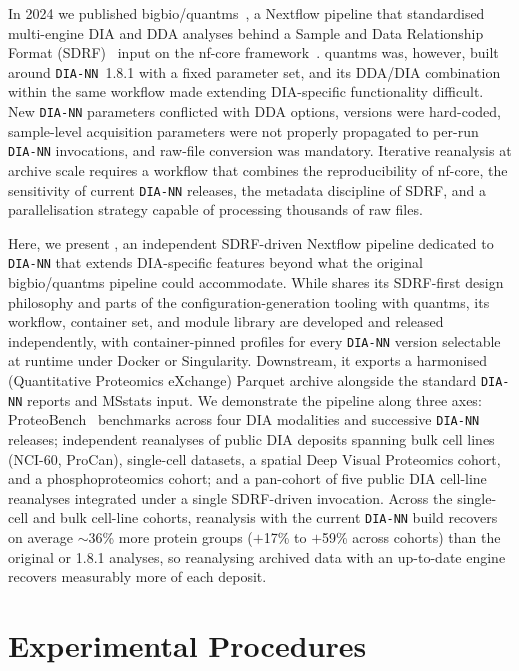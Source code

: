 \documentclass[preprint,12pt]{elsarticle}
\begin{document}
In 2024 we published bigbio/quantms~\cite{dai2024quantms}, a Nextflow pipeline that standardised multi-engine DIA and DDA analyses behind a Sample and Data Relationship Format (SDRF)~\cite{dai2021sdrf} input on the nf-core framework~\cite{ewels2020nfcore}. quantms was, however, built around \texttt{DIA-NN}~1.8.1 with a fixed parameter set, and its DDA/DIA combination within the same workflow made extending DIA-specific functionality difficult. New \texttt{DIA-NN} parameters conflicted with DDA options, versions were hard-coded, sample-level acquisition parameters were not properly propagated to per-run \texttt{DIA-NN} invocations, and raw-file conversion was mandatory. Iterative reanalysis at archive scale requires a workflow that combines the reproducibility of nf-core, the sensitivity of current \texttt{DIA-NN} releases, the metadata discipline of SDRF, and a parallelisation strategy capable of processing thousands of raw files.

Here, we present \quantmsdiann{}, an independent SDRF-driven Nextflow pipeline dedicated to \texttt{DIA-NN} that extends DIA-specific features beyond what the original bigbio/quantms pipeline could accommodate. While \quantmsdiann{} shares its SDRF-first design philosophy and parts of the configuration-generation tooling with quantms, its workflow, container set, and module library are developed and released independently, with container-pinned profiles for every \texttt{DIA-NN} version selectable at runtime under Docker or Singularity. Downstream, it exports a harmonised \qpx{} (Quantitative Proteomics eXchange) Parquet archive alongside the standard \texttt{DIA-NN} reports and MSstats input. We demonstrate the pipeline along three axes: ProteoBench~\cite{devreese2025proteobench} benchmarks across four DIA modalities and successive \texttt{DIA-NN} releases; independent reanalyses of public DIA deposits spanning bulk cell lines (NCI-60, ProCan), single-cell datasets, a spatial Deep Visual Proteomics cohort, and a phosphoproteomics cohort; and a pan-cohort of five public DIA cell-line reanalyses integrated under a single SDRF-driven invocation. Across the single-cell and bulk cell-line cohorts, reanalysis with the current \texttt{DIA-NN} build recovers on average $\sim$36\% more protein groups ($+$17\% to $+$59\% across cohorts) than the original or 1.8.1 analyses, so reanalysing archived data with an up-to-date engine recovers measurably more of each deposit.

\section{Experimental Procedures}
\label{sec:methods}
\end{document}
